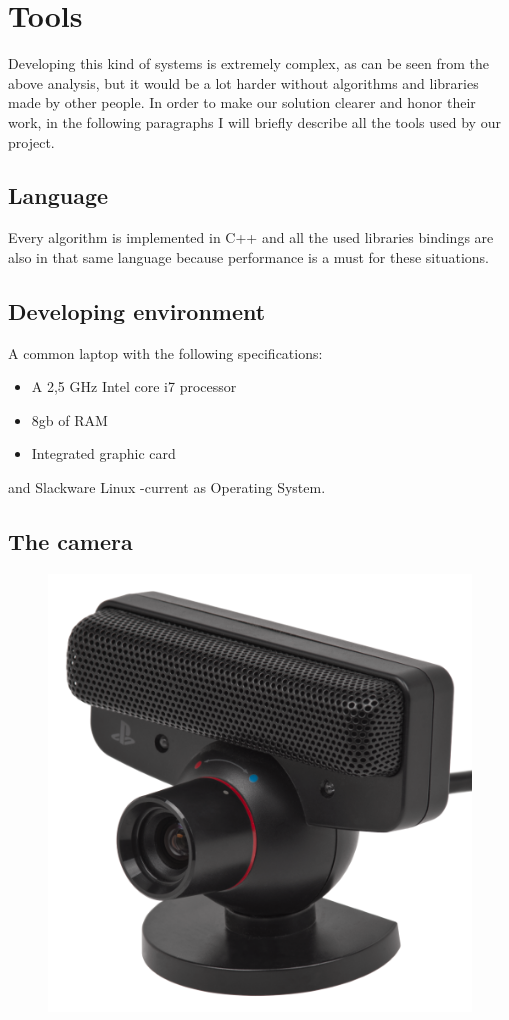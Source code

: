 \chapter{Tools}
\vspace{6cm}
Developing this kind of systems is extremely complex, as can be seen from the above analysis, but it would be a lot harder without algorithms and libraries made by other people.
In order to make our solution clearer and honor their work, in the following paragraphs I will briefly describe all the tools used by our project.
\newpage

\section{Language}
Every algorithm is implemented in C++ and all the used libraries bindings are also in that same language because performance is a must for these situations.   

\section{Developing environment}
A common laptop with the following specifications:
\begin{itemize}
  \item A 2,5 GHz Intel core i7 processor
  \item 8gb of RAM
  \item Integrated graphic card
\end{itemize}
and Slackware Linux -current as Operating System.


\section{The camera}
\begin{figure}[hbt]
    \vspace{1cm}
    \centering
    \includegraphics{img/pseye.png}
    \vspace{1cm}
\end{figure}

